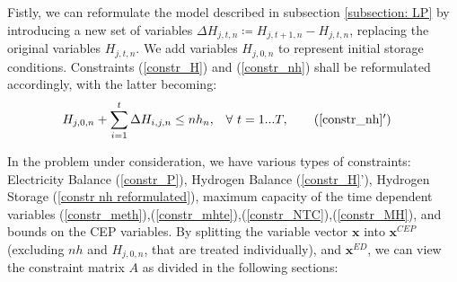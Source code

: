 \documentclass[smallextended,natbib]{svjour3}       %
\numberwithin{theorem}{section}
\begin{document}
Fistly, we can reformulate the model described in subsection \ref{subsection: LP} by introducing a new set of variables \(\Delta H_{j,t,n} \coloneqq H_{j,t+1,n} - H_{j,t,n}\), replacing the original variables \(H_{j,t,n}\). 
We add variables $H_{j,0,n}$ to represent initial storage conditions.
Constraints (\ref{constr_H}) and (\ref{constr_nh}) shall be reformulated accordingly, with the latter becoming:
\begin{align}
  H_{j,0,n} + \sum_{i=1}^{t} \Delta H_{i,j,n} \le nh_{n}, & \quad \forall\  t =1...T, \tag{\ref{constr_nh}$'$}\label{constr nh reformulated}
\end{align}

In the problem under consideration, we have various types of constraints: Electricity Balance (\ref{constr_P}), Hydrogen Balance (\ref{constr_H}'), Hydrogen Storage (\ref{constr nh reformulated}), maximum capacity of the time dependent variables (\ref{constr_meth}),(\ref{constr_mhte}),(\ref{constr_NTC}),(\ref{constr_MH}), and bounds on the CEP variables.
By splitting the variable vector $\mathbf{x}$ into $\mathbf{x}^{CEP}$ (excluding $nh$ and $H_{j,0,n}$, that are treated individually), and $\mathbf{x}^{ED}$, we can view the constraint matrix $A$ as divided in the following sections:
\end{document}
